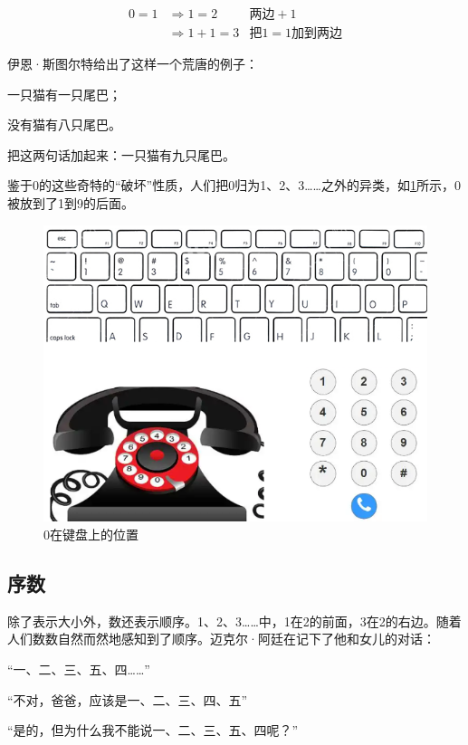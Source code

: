 \documentclass[b5paper]{ctexart}
\begin{document}
\begin{enumerate}[1)]
\begin{align*}
0 = 1 & \Rightarrow 1 = 2     & \text{两边} + 1 \\
      & \Rightarrow 1 + 1 = 3 & \text{把} 1 = 1 \text{加到两边}
\end{align*}

伊恩·斯图尔特给出了这样一个荒唐的例子\cite{Stewart-2019}：

一只猫有一只尾巴；

没有猫有八只尾巴。

把这两句话加起来：一只猫有九只尾巴。
\end{enumerate}

鉴于0的这些奇特的“破坏”性质，人们把0归为1、2、3……之外的异类，如\cref{fig:keyboard}所示，0被放到了1到9的后面。

\begin{figure}[htbp]
 \centering
 \includegraphics[scale=0.35]{img/keyboard}
 \caption{0在键盘上的位置}
 \label{fig:keyboard}
\end{figure}

\subsection{序数}
除了表示大小外，数还表示顺序。1、2、3……中，1在2的前面，3在2的右边。随着人们数数自然而然地感知到了顺序。迈克尔·阿廷在记下了他和女儿的对话\cite{MArtin-2011}：

“一、二、三、五、四……”

“不对，爸爸，应该是一、二、三、四、五”

“是的，但为什么我不能说一、二、三、五、四呢？”
\end{document}
